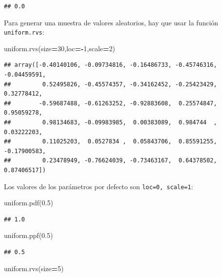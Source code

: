 \documentclass[]{book}
\newenvironment{Shaded}{\begin{snugshade}}{\end{snugshade}}
\newcommand{\DecValTok}[1]{\textcolor[rgb]{0.00,0.00,0.81}{#1}}
\newcommand{\FloatTok}[1]{\textcolor[rgb]{0.00,0.00,0.81}{#1}}
\newcommand{\NormalTok}[1]{#1}
\newcommand{\OperatorTok}[1]{\textcolor[rgb]{0.81,0.36,0.00}{\textbf{#1}}}
\begin{document}
\begin{verbatim}
## 0.0
\end{verbatim}

Para generar una muestra de valores aleatorios, hay que usar la función \texttt{uniform.rvs}:

\begin{Shaded}
\begin{Highlighting}[]
\NormalTok{uniform.rvs(size}\OperatorTok{=}\DecValTok{30}\NormalTok{,loc}\OperatorTok{=-}\DecValTok{1}\NormalTok{,scale}\OperatorTok{=}\DecValTok{2}\NormalTok{)}
\end{Highlighting}
\end{Shaded}

\begin{verbatim}
## array([-0.40140106, -0.09734816, -0.16486733, -0.45746316, -0.04459591,
##         0.52495826, -0.45574357, -0.34162452, -0.25423429,  0.32778412,
##        -0.59687488, -0.61263252, -0.92883608,  0.25574847,  0.95059278,
##         0.98134683, -0.09983985,  0.00383089,  0.984744  ,  0.03222203,
##         0.11025203,  0.0527834 ,  0.05843706,  0.85591255, -0.17900583,
##         0.23478949, -0.76624039, -0.73463167,  0.64378502,  0.87406517])
\end{verbatim}

Los valores de los parámetros por defecto son \texttt{loc=0,\ scale=1}:

\begin{Shaded}
\begin{Highlighting}[]
\NormalTok{uniform.pdf(}\FloatTok{0.5}\NormalTok{)}
\end{Highlighting}
\end{Shaded}

\begin{verbatim}
## 1.0
\end{verbatim}

\begin{Shaded}
\begin{Highlighting}[]
\NormalTok{uniform.ppf(}\FloatTok{0.5}\NormalTok{)}
\end{Highlighting}
\end{Shaded}

\begin{verbatim}
## 0.5
\end{verbatim}

\begin{Shaded}
\begin{Highlighting}[]
\NormalTok{uniform.rvs(size}\OperatorTok{=}\DecValTok{5}\NormalTok{)}
\end{Highlighting}
\end{Shaded}
\end{document}
